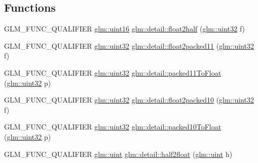 \subsection*{Functions}
\begin{DoxyCompactItemize}
\item 
G\+L\+M\+\_\+\+F\+U\+N\+C\+\_\+\+Q\+U\+A\+L\+I\+F\+I\+E\+R \hyperlink{group__gtc__type__precision_gad8c2939e1fdd8e5828b31d95c52255d5}{glm\+::uint16} \hyperlink{namespaceglm_1_1detail_a35cfc58b7112bdadd2610cf9f1780255}{glm\+::detail\+::float2half} (\hyperlink{group__gtc__type__precision_ga202b6a53c105fcb7e531f9b443518451}{glm\+::uint32} f)
\item 
G\+L\+M\+\_\+\+F\+U\+N\+C\+\_\+\+Q\+U\+A\+L\+I\+F\+I\+E\+R \hyperlink{group__gtc__type__precision_ga202b6a53c105fcb7e531f9b443518451}{glm\+::uint32} \hyperlink{namespaceglm_1_1detail_af3fe5d54f7627eb98c3493ee0a4b6fba}{glm\+::detail\+::float2packed11} (\hyperlink{group__gtc__type__precision_ga202b6a53c105fcb7e531f9b443518451}{glm\+::uint32} f)
\item 
G\+L\+M\+\_\+\+F\+U\+N\+C\+\_\+\+Q\+U\+A\+L\+I\+F\+I\+E\+R \hyperlink{group__gtc__type__precision_ga202b6a53c105fcb7e531f9b443518451}{glm\+::uint32} \hyperlink{namespaceglm_1_1detail_a02d2bd65041cc9eb287030ae553051f0}{glm\+::detail\+::packed11\+To\+Float} (\hyperlink{group__gtc__type__precision_ga202b6a53c105fcb7e531f9b443518451}{glm\+::uint32} p)
\item 
G\+L\+M\+\_\+\+F\+U\+N\+C\+\_\+\+Q\+U\+A\+L\+I\+F\+I\+E\+R \hyperlink{group__gtc__type__precision_ga202b6a53c105fcb7e531f9b443518451}{glm\+::uint32} \hyperlink{namespaceglm_1_1detail_a066e984b6ff1a54325e8d11afed5a0f9}{glm\+::detail\+::float2packed10} (\hyperlink{group__gtc__type__precision_ga202b6a53c105fcb7e531f9b443518451}{glm\+::uint32} f)
\item 
G\+L\+M\+\_\+\+F\+U\+N\+C\+\_\+\+Q\+U\+A\+L\+I\+F\+I\+E\+R \hyperlink{group__gtc__type__precision_ga202b6a53c105fcb7e531f9b443518451}{glm\+::uint32} \hyperlink{namespaceglm_1_1detail_a4b6b6f9fdf91cf039dfb119f94686f8a}{glm\+::detail\+::packed10\+To\+Float} (\hyperlink{group__gtc__type__precision_ga202b6a53c105fcb7e531f9b443518451}{glm\+::uint32} p)
\item 
G\+L\+M\+\_\+\+F\+U\+N\+C\+\_\+\+Q\+U\+A\+L\+I\+F\+I\+E\+R \hyperlink{stb__image_8c_a91ad9478d81a7aaf2593e8d9c3d06a14}{glm\+::uint} \hyperlink{namespaceglm_1_1detail_a69b64ab4be52c9601b31588c8c813ca0}{glm\+::detail\+::half2float} (\hyperlink{stb__image_8c_a91ad9478d81a7aaf2593e8d9c3d06a14}{glm\+::uint} h)
\item 

\end{DoxyCompactItemize}
